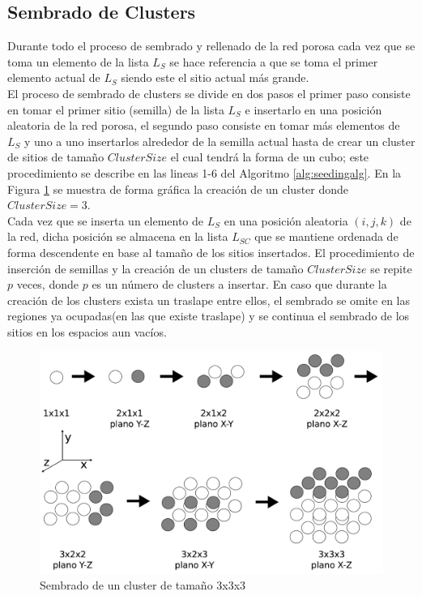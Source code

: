\subsection{Sembrado de Clusters}
\label{subsec:sseeding}
Durante todo el proceso de sembrado y rellenado de la red porosa cada vez que se toma un elemento de la lista $L_S$ se hace referencia a que se toma el primer elemento actual de $L_S$ siendo este el sitio actual más grande.\\

El proceso de sembrado de clusters se divide en dos pasos el primer paso consiste en tomar el primer sitio (semilla) de la lista $L_S$ e insertarlo en una posición aleatoria de la red porosa, el segundo paso consiste en tomar más elementos de $L_S$ y uno a uno insertarlos alrededor de la semilla actual hasta de crear un cluster de sitios de tamaño $ClusterSize$ el cual tendrá la forma de un cubo; este procedimiento se describe en las lineas 1-6 del Algoritmo \ref{alg:seedingalg}. En la Figura \ref{fig:cluster} se muestra de forma gráfica la creación de un cluster donde $ClusterSize=3$.\\

Cada vez que se inserta un elemento de $L_S$ en una posición aleatoria $(i,j,k)$ de la red, dicha posición se almacena en la lista $L_{SC}$ que se mantiene ordenada de forma descendente en base al tamaño de los sitios insertados. El procedimiento de inserción de semillas y la creación de un clusters de tamaño $ClusterSize$ se repite $p$ veces, donde $p$ es un número de clusters a insertar. En caso que durante la creación de los clusters exista un traslape entre ellos, el sembrado se omite en las regiones ya ocupadas(en las que existe traslape) y se continua el sembrado de los sitios en los espacios aun vacíos.\\

\begin{figure}[hbtp]
\centering
\includegraphics[width=5.0in]{img/cluster_es.pdf}
\caption{Sembrado de un cluster de tamaño 3x3x3}
\label{fig:cluster}
\end{figure}

